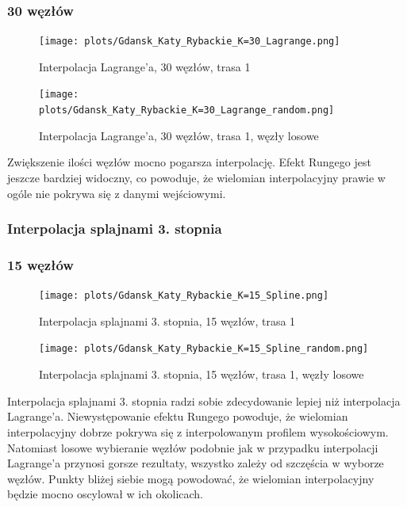 \documentclass{article}
\begin{document}
\subsubsection*{\hfil 30 węzłów \hfil }
\begin{figure}[H]
    \centering
    \texttt{[image: plots/Gdansk\_Katy\_Rybackie\_K=30\_Lagrange.png]}
    \caption{Interpolacja Lagrange'a, 30 węzłów, trasa 1}
\end{figure}

\begin{figure}[H]
    \centering
    \texttt{[image: plots/Gdansk\_Katy\_Rybackie\_K=30\_Lagrange\_random.png]}
    \caption{Interpolacja Lagrange'a, 30 węzłów, trasa 1, węzły losowe}
\end{figure}

Zwiększenie ilości węzłów mocno pogarsza interpolację. Efekt Rungego jest jeszcze bardziej widoczny,
co powoduje, że wielomian interpolacyjny prawie w ogóle nie pokrywa się z danymi wejściowymi.

\subsubsection{Interpolacja splajnami 3. stopnia}

\subsubsection*{\hfil 15 węzłów \hfil }
\begin{figure}[H]
    \centering
    \texttt{[image: plots/Gdansk\_Katy\_Rybackie\_K=15\_Spline.png]}
    \caption{Interpolacja splajnami 3. stopnia, 15 węzłów, trasa 1}
\end{figure}

\begin{figure}[H]
    \centering
    \texttt{[image: plots/Gdansk\_Katy\_Rybackie\_K=15\_Spline\_random.png]}
    \caption{Interpolacja splajnami 3. stopnia, 15 węzłów, trasa 1, węzły losowe}
\end{figure}

Interpolacja splajnami 3. stopnia radzi sobie zdecydowanie lepiej niż interpolacja Lagrange'a.
Niewystępowanie efektu Rungego powoduje, że wielomian interpolacyjny dobrze pokrywa się z interpolowanym profilem
wysokościowym. Natomiast losowe wybieranie węzłów podobnie jak w przypadku interpolacji Lagrange'a
przynosi gorsze rezultaty, wszystko zależy od szczęścia w wyborze węzłów. Punkty bliżej siebie
mogą powodować, że wielomian interpolacyjny będzie mocno oscylował w ich okolicach.
\end{document}
